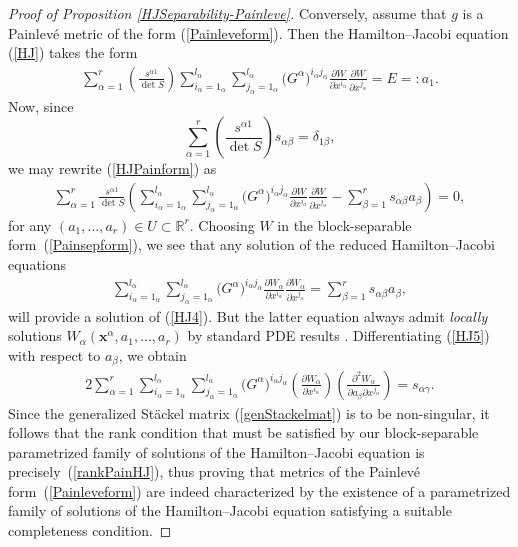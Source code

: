 \documentclass[11pt]{article}
\numberwithin{equation}{section}
\newcommand{\ialpha}{i_{\alpha}}
\newcommand{\jalpha}{j_{\alpha}}
\newcommand{\lalpha}{l_{\alpha}}
\begin{document}
\begin{proof}[Proof of Proposition \ref{HJSeparability-Painleve}]
Conversely, assume that $g$ is a Painlev\'e metric of the form (\ref{Painleveform}). Then the Hamilton--Jacobi equation (\ref{HJ}) takes the form
\begin{gather}\label{HJPainform}
\sum_{\alpha =1}^{r} \left(\frac{s^{\alpha 1}}{\det S}\right) \sum_{\ialpha =1_{\alpha}}^{\lalpha}\sum_{\jalpha =1_{\alpha}}^{\lalpha} \big(G^{\alpha}\big)^{\ialpha \jalpha}\frac{\partial W}{\partial x^{\ialpha} }\frac{\partial W}{\partial x^{\jalpha}}=E=:a_{1}.
\end{gather}
Now, since
\[
\sum_{\alpha =1}^{r}\left(\frac{s^{\alpha 1}}{\det S}\right)s_{\alpha \beta}=\delta_{1 \beta},
\]
we may rewrite (\ref{HJPainform}) as
\begin{gather} \label{HJ4}
\sum_{\alpha =1}^{r}\frac{s^{\alpha 1}}{\det S}\left(\sum_{\ialpha =1_{\alpha}}^{\lalpha}\sum_{\jalpha =1_{\alpha}}^{\lalpha}\big(G^{\alpha}\big)^{\ialpha \jalpha}\frac{\partial W}{\partial x^{\ialpha} }\frac{\partial W}{\partial x^{\jalpha}}-\sum_{\beta=1}^{r}s_{\alpha \beta}a_{\beta}\right)=0,
\end{gather}
for any $(a_1,\dots,a_r) \in U \subset \mathbb{R}^r$. Choosing $W$ in the block-separable form~(\ref{Painsepform}), we see that any solution of the reduced Hamilton--Jacobi equations
\begin{gather} \label{HJ5}
\sum_{\ialpha =1_{\alpha}}^{\lalpha}\sum_{\jalpha =1_{\alpha}}^{\lalpha}\big(G^{\alpha}\big)^{\ialpha \jalpha}\frac{\partial W_{\alpha}}{\partial x^{\ialpha} }\frac{\partial W_{\alpha}}{\partial x^{\jalpha}}=\sum_{\beta = 1}^{r}s_{\alpha \beta}a_{\beta},
\end{gather}
will provide a solution of (\ref{HJ4}). But the latter equation always admit \emph{locally} solutions $W_\alpha(\textbf{x}^\alpha, \allowbreak a_1,\dots,a_r)$ by standard PDE results \cite{Tay2011a}. Differentiating (\ref{HJ5}) with respect to $a_{\beta}$, we obtain
\begin{gather*} %
2\sum_{\alpha =1}^{r}\sum_{\ialpha =1_{\alpha}}^{\lalpha}\sum_{\jalpha =1_{\alpha}}^{\lalpha}\big(G^{\alpha}\big)^{\ialpha \jalpha}\left(\frac{\partial W_{\alpha}}{\partial x^{\ialpha}}\right)\left( \frac{\partial^{2}W_{\alpha}}{\partial a_{\beta}\partial x^{\jalpha}}\right)=s_{\alpha \gamma}.
\end{gather*}
Since the generalized St\"ackel matrix (\ref{genStackelmat}) is to be non-singular, it follows that the rank condition that must be satisfied by our block-separable parametrized family of solutions of the Hamilton--Jacobi equation is precisely~(\ref{rankPainHJ}), thus proving that metrics of the Painlev\'e form~(\ref{Painleveform}) are indeed characterized by the existence of a parametrized family of solutions of the Hamilton--Jacobi equation satisfying a suitable completeness condition.
\end{proof}
\end{document}

